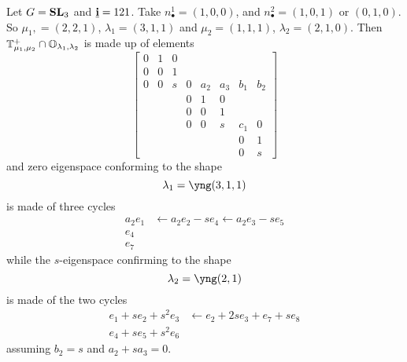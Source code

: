 \begin{example}
    Let $G = {\mathbf{SL}}_3$ and $\underline{\mathbf{i}} = 121$.
    Take $n_\bullet^1 = (1,0,0)$, and $n_\bullet^2 = (1,0,1)$ or $(0,1,0)$. So $\mu_1, = (2,2,1)$, $\lambda_1 = (3,1,1)$ and $\mu_2 = (1,1,1)$, $\lambda_2 = (2,1,0)$. 
    Then $\mathbb T_{\mu_1,\mu_2}^+\cap\mathbb O_{\lambda_1,\lambda_2}$ is made up of elements 
    \[
    \begin{bmatrix}
        0 & 1 & 0 \\
        0 & 0 & 1 \\
        0 & 0 & s & 0 & a_2 & a_3 & b_1 & b_2 \\
          &   &   & 0 & 1 & 0 \\
          &   &   & 0 & 0 & 1 \\
          &   &   & 0 & 0 & s & c_1 & 0 \\
          &   &   &   &   &   & 0 & 1 \\
          &   &   &   &   &   & 0 & s 
    \end{bmatrix}    
    \]
    and zero eigenspace conforming to the shape 
    \[
    \lambda_1 = \yng(3,1,1)    
    \] 
    is made of three cycles
    \begin{align*}
        a_2 e_1 &\leftarrow a_2e_2 - s e_4 \leftarrow a_2 e_3 - s e_5 \\
        e_4 & \\
        e_7 & 
    \end{align*}
    while the $s$-eigenspace confirming to the shape 
    \[
    \lambda_2 = \yng(2,1)    
    \]
    is made of the two cycles 
    \begin{align*}
        e_1 + se_2 +s^2 e_3 & \leftarrow e_2 + 2se_3 + e_7 + se_8 \\
        e_4 + s e_5 + s^2 e_6 & 
    \end{align*}
    assuming $b_2 = s$ and $a_2 + sa_3 = 0$. 
\end{example}